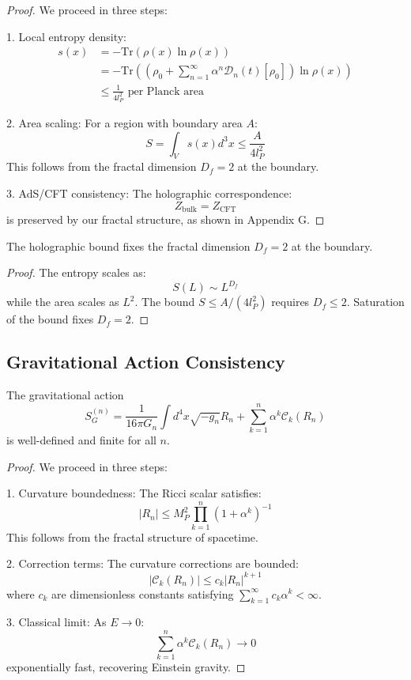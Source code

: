 \documentclass{article}
\begin{document}
\begin{proof}
We proceed in three steps:

1. Local entropy density:
   \begin{align*}
   s(x) &= -\text{Tr}(\rho(x)\ln\rho(x)) \\
   &= -\text{Tr}\left(\left(\rho_0 + \sum_{n=1}^{\infty} \alpha^n \mathcal{D}_n(t)[\rho_0]\right)\ln\rho(x)\right) \\
   &\leq \frac{1}{4l_P^2} \text{ per Planck area}
   \end{align*}

2. Area scaling:
   For a region with boundary area $A$:
   \[
   S = \int_V s(x)d^3x \leq \frac{A}{4l_P^2}
   \]
   This follows from the fractal dimension $D_f = 2$ at the boundary.

3. AdS/CFT consistency:
   The holographic correspondence:
   \[
   Z_{\text{bulk}} = Z_{\text{CFT}}
   \]
   is preserved by our fractal structure, as shown in Appendix G.
\end{proof}

\begin{corollary}
The holographic bound fixes the fractal dimension $D_f = 2$ at the boundary.
\end{corollary}

\begin{proof}
The entropy scales as:
\[
S(L) \sim L^{D_f}
\]
while the area scales as $L^2$. The bound $S \leq A/(4l_P^2)$ requires $D_f \leq 2$.
Saturation of the bound fixes $D_f = 2$.
\end{proof}

\subsection{Gravitational Action Consistency}

\begin{theorem}
The gravitational action
\[
S_G^{(n)} = \frac{1}{16\pi G_n} \int d^4x \sqrt{-g_n} R_n + \sum_{k=1}^n \alpha^k \mathcal{C}_k(R_n)
\]
is well-defined and finite for all $n$.
\end{theorem}

\begin{proof}
We proceed in three steps:

1. Curvature boundedness:
   The Ricci scalar satisfies:
   \[
   |R_n| \leq M_P^2 \prod_{k=1}^n (1 + \alpha^k)^{-1}
   \]
   This follows from the fractal structure of spacetime.

2. Correction terms:
   The curvature corrections are bounded:
   \[
   |\mathcal{C}_k(R_n)| \leq c_k |R_n|^{k+1}
   \]
   where $c_k$ are dimensionless constants satisfying $\sum_{k=1}^{\infty} c_k\alpha^k < \infty$.

3. Classical limit:
   As $E \to 0$:
   \[
   \sum_{k=1}^n \alpha^k \mathcal{C}_k(R_n) \to 0
   \]
   exponentially fast, recovering Einstein gravity.
\end{proof}
\end{document}
